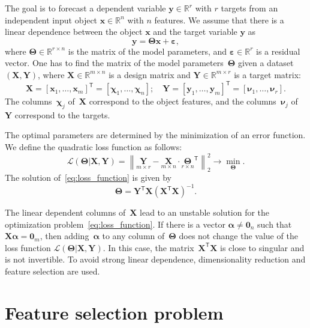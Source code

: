 \documentclass[preprint,authoryear,12pt]{elsarticle}
\theoremstyle{definition}
\newcommand{\bx}{\mathbf{x}}
\newcommand{\by}{\mathbf{y}}
\newcommand{\bY}{\mathbf{Y}}
\newcommand{\bX}{\mathbf{X}}
\newcommand{\bbR}{\mathbb{R}}
\newcommand{\T}{\mathsf{T}}
\newcommand{\bchi}{\boldsymbol{\chi}}
\newcommand{\bnu}{\boldsymbol{\nu}}
\newcommand{\bTheta}{\boldsymbol{\Theta}}
\newcommand{\bZero}{\boldsymbol{0}}
\begin{document}
The goal is to forecast a dependent variable $\by \in \bbR^r$ with $r$ targets from an independent input object $\bx \in \bbR^n$ with $n$ features.
We assume that there is a linear dependence between the object $\bx$ and the target variable $\by$ as
\begin{equation}
\by = \bTheta \bx+ \boldsymbol{\varepsilon},
\label{eq:model}
\end{equation}
where $\bTheta \in \bbR^{r \times n}$ is the matrix of the model parameters, and $\boldsymbol{\varepsilon} \in \bbR^{r}$ is a residual vector.
One has to find the matrix of the model parameters~$\bTheta$ given a dataset $\left( \bX, \bY \right)$, where $\bX \in \bbR^{m \times n}$ is a design matrix and $\bY \in \bbR^{m \times r}$ is a target matrix:
\begin{equation*}
\bX = [\bx_1, \dots, \bx_m]^{\T} =  [\bchi_1, \dots, \bchi_n]; \quad \bY = [\by_1, \dots, \by_m]^{\T} =  [\bnu_1, \dots, \bnu_r].
\end{equation*}
The columns~$\bchi_j$ of~$\bX$ correspond to the object features, and the columns~$\bnu_j$ of~$\bY$ correspond to the targets.

The optimal parameters are determined by the minimization of an error function.
We define the quadratic loss function as follows:
\begin{equation}
\mathcal{L}(\bTheta | \bX, \bY) = {\left\| \underset{m \times r}{\mathbf{Y}}  - \underset{m \times n}{\bX} \cdot \underset{r \times n}{\bTheta}^{\T} \right\| }_2^2 \rightarrow\min_{\bTheta}.
\label{eq:loss_function}
\end{equation}
The solution of~\eqref{eq:loss_function} is given by
\begin{equation*}
\bTheta = \bY^{\T} \bX (\bX^{\T} \bX)^{-1}.
\end{equation*}

The linear dependent columns of~$\bX$ lead to an unstable solution for the optimization problem~\eqref{eq:loss_function}.
If there is a vector $\boldsymbol{\alpha} \neq \bZero_n$ such that $\bX \boldsymbol{\alpha}= \bZero_m$, then adding~$\boldsymbol{\alpha}$ to any column of~$\bTheta$ does not change the value of the loss function $\mathcal{L}(\bTheta | \bX, \bY)$.
In this case, the matrix~$\bX^{\T} \bX$ is close to singular and is not invertible.
To avoid strong linear dependence, dimensionality reduction and feature selection are used.

\section{Feature selection problem}
\end{document}
